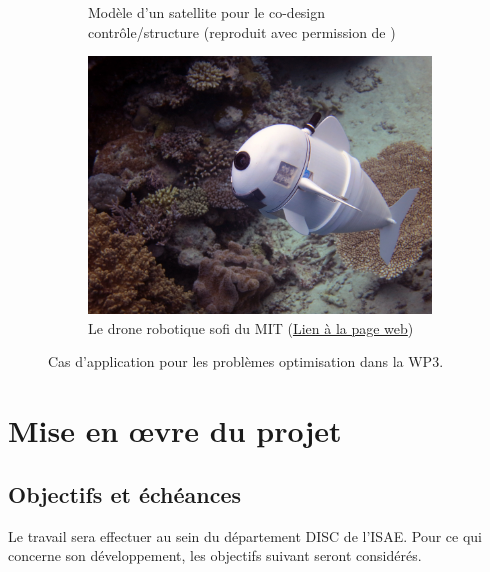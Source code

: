 \documentclass[12pt, french]{article}
\begin{document}
\begin{figure}[t]
\begin{subfigure}[t]{0.3\textwidth}
		\caption{Modèle d'un satellite pour le co-design contrôle/structure (reproduit avec permission de \cite{finozzi2022sub})}
		\label{fig:codesign_sat}
	\end{subfigure}\hfill
	\begin{subfigure}[t]{0.35\textwidth}
		\includegraphics[width=\columnwidth]{Sofi_MIT.jpeg}%
		\caption{Le drone robotique sofi du MIT (\href{https://www.csail.mit.edu/research/sofi-soft-robotic-fish}{Lien à la page web})}
		\label{fig:sofi-mit}
	\end{subfigure}
	\caption[]{Cas d'application pour les problèmes optimisation dans la WP3.}%
	\label{fig:optmisation}%
\end{figure}


\section{Mise en \oe{}vre du projet}

\subsection{Objectifs et échéances}

Le travail sera effectuer au sein du département DISC de l'ISAE. Pour ce qui concerne son développement, les objectifs suivant seront considérés.
\end{document}
